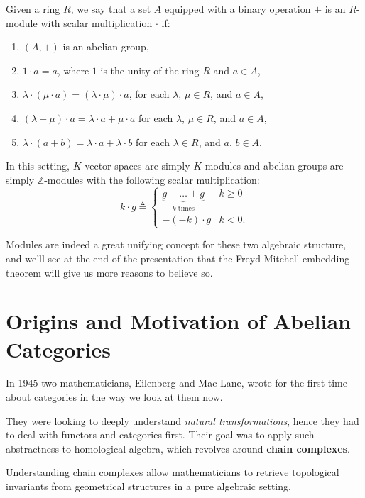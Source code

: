 \documentclass{beamer}
\newcommand{\ZZ}{\mathbb{Z}}
\begin{document}
\begin{frame}
    \begin{definition}[$R$-module]
        Given a ring $R$, we say that a set $A$ equipped with a binary operation $+$ is an $R$-module with
        scalar multiplication $\cdot$ if:
        \begin{enumerate}
            \item $(A, +)$ is an abelian group,
            \item $1 \cdot a = a$, where $1$ is the unity of the ring $R$ and $a \in A$,
            \item $\lambda \cdot (\mu \cdot a) = (\lambda \cdot \mu) \cdot a$, for each $\lambda$, $\mu \in R$, and $a \in A$, 
            \item $(\lambda + \mu) \cdot a = \lambda \cdot a + \mu \cdot a$ for each $\lambda$, $\mu \in R$, and $a \in A$,
            \item $\lambda \cdot (a + b) = \lambda \cdot a + \lambda \cdot b$ for each $\lambda \in R$, and $a$, $b \in A$.
        \end{enumerate}
    \end{definition}
\end{frame}

\begin{frame}
    In this setting, $K$-vector spaces are simply $K$-modules and abelian groups
    are simply $\ZZ$-modules with the following scalar multiplication:
    \[
        k \cdot g \triangleq \begin{cases}
            \underbrace{g + \ldots + g}_{k \text{ times}} & k \geq 0 \\
            -(-k) \cdot g & k < 0.
        \end{cases}
    \] \smallskip

    Modules are indeed a great unifying concept for these two algebraic structure, and we'll see
    at the end of the presentation that the Freyd-Mitchell embedding theorem will
    give us more reasons to believe so.
\end{frame}


\section{Origins and Motivation of Abelian Categories}

\begin{frame}
    In 1945 two mathematicians, Eilenberg and Mac Lane, wrote for the
    first time about categories in the way we look at them now. \medskip
    
    They were looking to
    deeply understand \textit{natural transformations}, hence they had
    to deal with functors and categories first. Their goal was to
    apply such abstractness to homological algebra, which revolves
    around \textbf{chain complexes}. \medskip

    Understanding chain complexes allow mathematicians to retrieve
    topological invariants from geometrical structures in a pure
    algebraic setting.
\end{frame}
\end{document}
